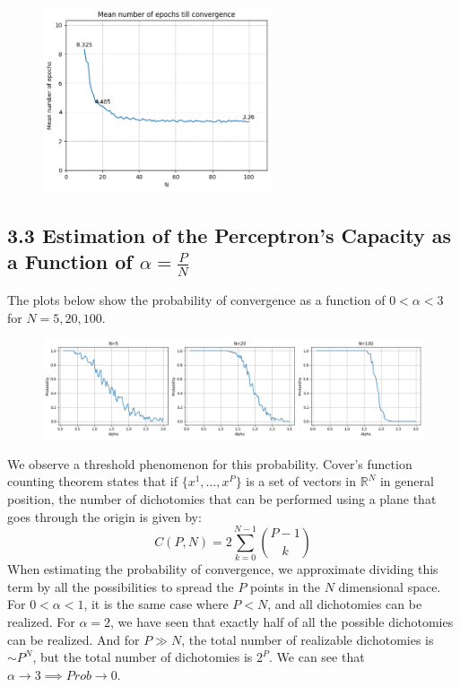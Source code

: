 \documentclass[a4paper, 12pt]{article}
\begin{document}
\begin{figure}[h]
    \centering
    \includegraphics[width=0.6\textwidth]{./assets/nn_ex1_3_2_1.png}
\end{figure}

\subsection*{3.3 Estimation of the Perceptron's Capacity as a Function of $\alpha = \frac{P}{N}$}
The plots below show the probability of convergence as a function of $0 < \alpha < 3$ for $N = 5, 20, 100$.

\begin{figure}[h]
    \centering
    \includegraphics[width=1\textwidth]{./assets/nn_ex1_3_3_1.png}
\end{figure}

We observe a threshold phenomenon for this probability. Cover's function counting theorem states that if $\{x^1, \dots, x^P\}$ is a set of vectors in 
$\mathbb{R} ^N$ in general position, the number of dichotomies that can be performed 
using a plane that goes through the origin is given by:
\[ C(P,N) = 2 \sum_{k=0}^{N-1} \binom{P-1}{k} \]
When estimating the probability of convergence, we approximate dividing this term
by all the possibilities to spread the $P$ points in the $N$ dimensional space. 
For $0 < \alpha < 1$, it is the same case where $P < N$, and all dichotomies can 
be realized. For $\alpha = 2$, we have seen that exactly half of all the possible dichotomies can be realized.
And for $P \gg N$, the total number of realizable dichotomies is $\sim P^N$, but the total 
number of dichotomies is $2^P$. We can see that $\alpha \rightarrow  3 \implies Prob \rightarrow 0$.
\end{document}
